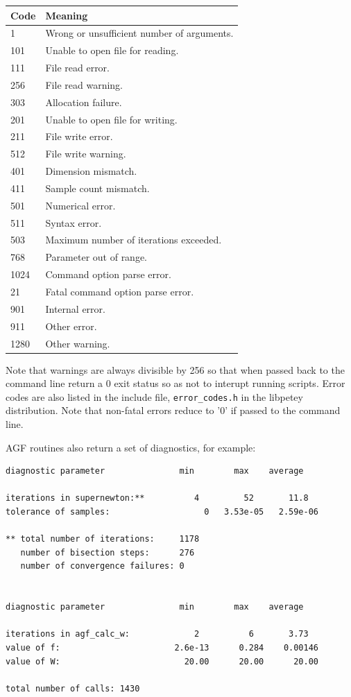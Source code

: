 \documentclass[12pt]{article}
\begin{document}
\begin{tabular}{ll}
Code & Meaning\\
\hline
  1	&	Wrong or unsufficient number of arguments.\\
101	&	Unable to open file for reading.\\
111	&	File read error.\\
256	&	File read warning.\\
303	&	Allocation failure.\\
201	&	Unable to open file for writing.\\
211	&	File write error.\\
512	&	File write warning.\\
401	&	Dimension mismatch.\\
411	&	Sample count mismatch.\\
501	&	Numerical error.\\
511	&	Syntax error.\\
503	&	Maximum number of iterations exceeded.\\
768	&	Parameter out of range.\\
1024	&	Command option parse error.\\
 21	&	Fatal command option parse error.\\
901	&	Internal error.\\
911	&	Other error.\\
1280	&	Other warning.
\end{tabular}

Note that warnings are always divisible by 256 so that when passed back to the command line return a 0 exit status so as not to interupt running scripts.  Error codes are also listed in the include file, \verb"error_codes.h" in the libpetey distribution.  Note that non-fatal errors reduce to '0' if passed to the command line.

  AGF routines also return a set of diagnostics, for example:

\begin{verbatim}
diagnostic parameter               min        max    average

iterations in supernewton:**          4         52       11.8
tolerance of samples:                   0   3.53e-05   2.59e-06

** total number of iterations:     1178
   number of bisection steps:      276
   number of convergence failures: 0


diagnostic parameter               min        max    average

iterations in agf_calc_w:             2          6       3.73
value of f:                       2.6e-13      0.284    0.00146
value of W:                         20.00      20.00      20.00

total number of calls: 1430

\end{verbatim}
\end{document}
